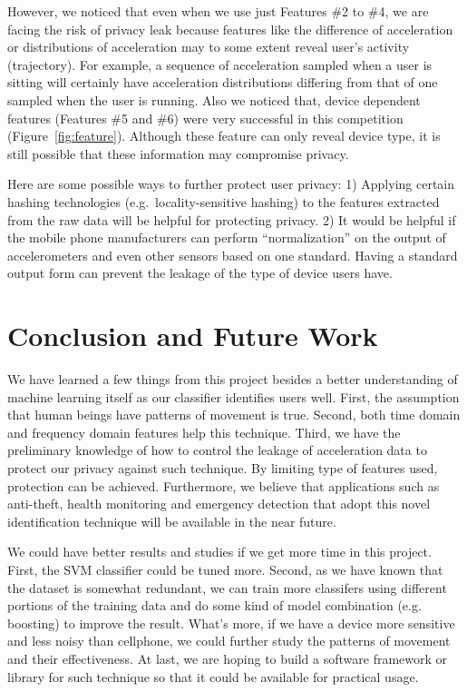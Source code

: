 \documentclass{article} %
\begin{document}
However, we noticed that even when we use just Features \#2 to \#4, we are facing the risk of privacy leak because features like the difference of acceleration or distributions of acceleration may to some extent reveal user's activity (trajectory). For example, a sequence of acceleration sampled when a user is sitting will certainly have acceleration distributions differing from that of one sampled when the user is running. Also we noticed that, device dependent features (Features \#5 and \#6) were very successful in this competition (Figure~\ref{fig:feature}). Although these feature can only reveal device type, it is still possible that these information may compromise privacy.

Here are some possible ways to further protect user privacy: 1) Applying certain hashing technologies (e.g.\ locality-sensitive hashing) to the features extracted from the raw data will be helpful for protecting privacy. 2) It would be helpful if the mobile phone manufacturers can perform ``normalization'' on the output of accelerometers and even other sensors based on one standard. Having a standard output form can prevent the leakage of the type of device users have.

\section{Conclusion and Future Work}


We have learned a few things from this project besides a better understanding of machine learning itself as our classifier identifies users well. First, the assumption that human beings have patterns of movement is true. Second, both time domain and frequency domain features help this technique. Third, we have the preliminary knowledge of how to control the leakage of acceleration data to protect our privacy against such technique. By limiting type of features used, protection can be achieved. Furthermore, we believe that applications such as anti-theft, health monitoring and emergency detection that adopt this novel identification technique will be available in the near future.

We could have better results and studies if we get more time in this project. First, the SVM classifier could be tuned more. Second, as we have known that the dataset is somewhat redundant, we can train more classifers using different portions of the training data and do some kind of model combination (e.g. boosting) to improve the result. What's more, if we have a device more sensitive and less noisy than cellphone, we could further study the patterns of movement and their effectiveness. At last, we are hoping to build a software framework or library for such technique so that it could be available for practical usage.




\end{document}
